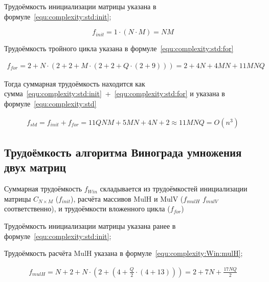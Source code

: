 Трудоёмкость инициализации матрицы указана в формуле~\eqref{equ:complexity:std:init};

\begin{equation}
	\label{equ:complexity:std:init}
	f_{init} = 1 \cdot (N \cdot M) = NM
\end{equation}

Трудоёмкость тройного цикла указана в формуле~\eqref{equ:complexity:std:for}

\begin{equation}
	\label{equ:complexity:std:for}
	\begin{gathered}
		f_{for} = 2 + N \cdot(2 + 2 + M\cdot (2 + 2 + Q \cdot (2 + 9))) = 2 + 4N + 4MN + 11MNQ
	\end{gathered}
\end{equation}

Тогда суммарная трудоёмкость находится как сумма~\eqref{equ:complexity:std:init}~+~\eqref{equ:complexity:std:for} и указана в формуле~\eqref{equ:complexity:std}

\begin{equation}
	\label{equ:complexity:std}
	\begin{gathered}
		f_{std} = f_{init} + f_{for} = 11QNM + 5MN + 4N + 2 \approx 11MNQ = O(n^3)
	\end{gathered}
\end{equation}
\clearpage

\subsection{Трудоёмкость алгоритма Винограда умножения двух матриц}

Суммарная трудоёмкость $f_{Win}$ складывается из трудоёмкостей инициализации матрицы $C_{N \times M}$ ($f_{init}$), расчёта массивов MulH и MulV ($f_{mulH}$ $f_{mulV}$ соответственно), и трудоёмкости вложенного цикла ($f_{for}$)

Трудоёмкость инициализации матрицы указана ранее в формуле~\eqref{equ:complexity:std:init};

Трудоёмкость расчёта MulH указана в формуле~\eqref{equ:complexity:Win:mulH};

\begin{equation}
	\label{equ:complexity:Win:mulH}
	\begin{gathered}
		f_{mulH} = N + 2 + N\cdot(2 + (4 + \frac{Q}{2} \cdot (4 + 13))) = 2 + 7N + \frac{17NQ}{2}
	\end{gathered}
\end{equation}

